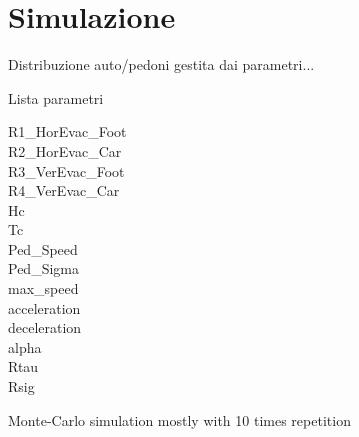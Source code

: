 \section{Simulazione}
\label{sec:simulazione}

Distribuzione auto/pedoni gestita dai parametri...

Lista parametri

\begin{description}
  \item[R1\_HorEvac\_Foot]
  \item[R2\_HorEvac\_Car]
  \item[R3\_VerEvac\_Foot]
  \item[R4\_VerEvac\_Car]
  \item[Hc]
  \item[Tc]
  \item[Ped\_Speed]
  \item[Ped\_Sigma]
  \item[max\_speed]
  \item[acceleration]
  \item[deceleration]
  \item[alpha]
  \item[Rtau]
  \item[Rsig]
\end{description}

Monte-Carlo simulation mostly with 10 times repetition
